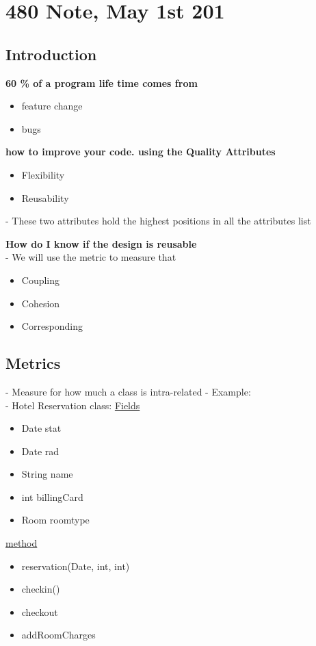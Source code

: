 \documentclass{article}
\begin{document}
\section{480 Note, May 1st 201}

\subsection{Introduction}
\textbf{ 60 \% of a program life time comes from}
\begin{itemize}
  \item feature change
  \item bugs
\end{itemize}

\textbf{ how to improve your code. using the Quality Attributes}
\begin{itemize}
  \item Flexibility
  \item Reusability
\end{itemize}

- These two attributes hold the highest positions in all the attributes list

\textbf{How do I know if the design is reusable}\\
- We will use the metric to measure that
\begin{itemize}
  \item Coupling
  \item Cohesion
  \item Corresponding
\end{itemize}

\subsection{ Metrics }
- Measure for how much a class is intra-related
- Example:\\
- Hotel Reservation class:
\underline{ Fields}
\begin{itemize}
  \item Date stat
  \item Date rad
  \item String name
  \item int billingCard
  \item Room roomtype
\end{itemize}
\underline{method}
\begin{itemize}
  \item reservation(Date, int, int)
  \item checkin()
  \item checkout
  \item addRoomCharges
\end{itemize}
\end{document}
